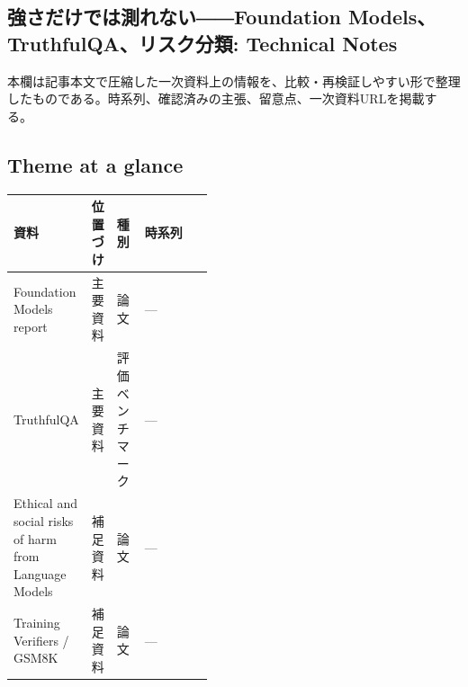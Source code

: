 \subsection*{強さだけでは測れない――Foundation Models、TruthfulQA、リスク分類: Technical Notes}
本欄は記事本文で圧縮した一次資料上の情報を、比較・再検証しやすい形で整理したものである。時系列、確認済みの主張、留意点、一次資料URLを掲載する。
\smallskip
{}\par
\medskip
\subsection*{Theme at a glance}
\begin{center}
\footnotesize
\begin{tabularx}{\linewidth}{@{}p{0.20\linewidth}p{0.10\linewidth}p{0.14\linewidth}X@{}}
\toprule
資料 & 位置づけ & 種別 & 時系列 \\
\midrule
Foundation Models report & 主要資料 & 論文 & — \\
TruthfulQA & 主要資料 & 評価ベンチマーク & — \\
Ethical and social risks of harm from Language Models & 補足資料 & 論文 & — \\
Training Verifiers / GSM8K & 補足資料 & 論文 & — \\
\bottomrule
\end{tabularx}
\end{center}
\normalsize

